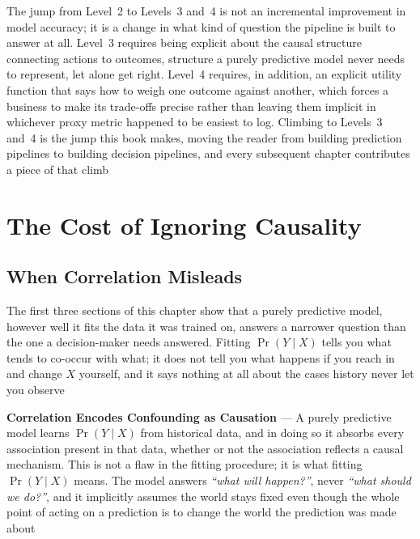 The jump from Level~2 to Levels~3 and~4 is not an incremental improvement in model
accuracy; it is a change in what kind of question the pipeline is built to
answer at all. Level~3 requires being explicit about the causal structure connecting
actions to outcomes, structure a purely predictive model never needs to
represent, let alone get right. Level~4 requires, in addition, an explicit
utility function that says how to weigh one outcome against another, which forces
a business to make its trade-offs precise rather than leaving them implicit in whichever
proxy metric happened to be easiest to log. Climbing to Levels~3 and~4 is the
jump this book makes, moving the reader from building prediction pipelines to building
decision pipelines, and every subsequent chapter contributes a piece of that
climb

\section{The Cost of Ignoring Causality}
\label{chap:cost-ignoring-causality}

\subsection{When Correlation Misleads}
\label{sec:when-correlation-misleads}

The first three sections of this chapter show that a purely predictive model,
however well it fits the data it was trained on, answers a narrower question than
the one a decision-maker needs answered. Fitting $\Pr(Y \mid X)$ tells you what
tends to co-occur with what; it does not tell you what happens if you reach in and
change $X$ yourself, and it says nothing at all about the cases history never
let you observe

\textbf{Correlation Encodes Confounding as Causation} --- A purely predictive
model learns $\Pr(Y \mid X)$ from historical data, and in doing so it absorbs every
association present in that data, whether or not the association reflects a
causal mechanism. This is not a flaw in the fitting procedure; it is what
fitting $\Pr(Y \mid X)$ means. The model answers \emph{``what will happen?''}, never
\emph{``what should we do?''}, and it implicitly assumes the world stays fixed even
though the whole point of acting on a prediction is to change the world the prediction
was made about

